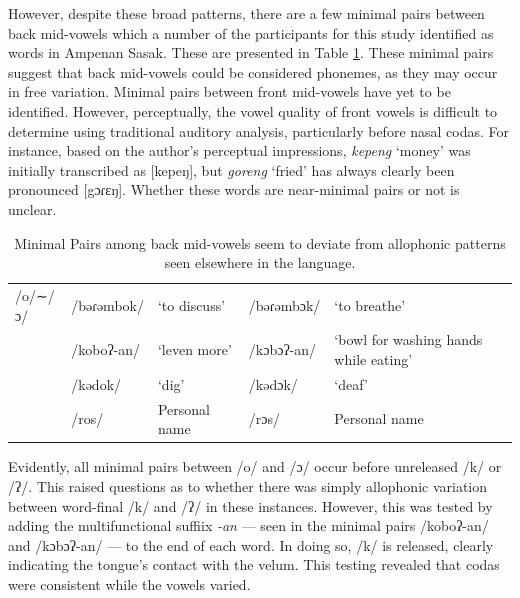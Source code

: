 \documentclass[12pt]{ouparticle}
\begin{document}
However, despite these broad patterns, there are a few  minimal pairs between back mid-vowels which a number of the participants for this study identified as words in Ampenan Sasak. These are presented in Table \ref{tab:minimal_pairs}. These minimal pairs suggest that back mid-vowels could be considered phonemes, as they may occur in free variation. Minimal pairs between front mid-vowels have yet to be identified. However, perceptually, the vowel quality of front vowels is difficult to determine using traditional auditory analysis, particularly before nasal codas. For instance, based on the author's perceptual impressions, \textit{kepeng} `money' was initially transcribed as [kepeŋ], but \textit{goreng} `fried' has always clearly been pronounced [gɔɾɛŋ]. Whether these words are near-minimal pairs or not is unclear.

\begin{table}[ht]
\caption{Minimal Pairs among back mid-vowels seem to deviate from allophonic patterns seen elsewhere in the language.}
\label{tab:minimal_pairs}
\begin{tabular}{l|ll|ll}
/o/∼/ɔ/	& /bəɾəmbok/ & `to discuss' & /bəɾəmbɔk/ & `to           breathe'\\
        & 	/koboʔ-an/ &	`leven more'	&  /kɔbɔʔ-an/& `bowl for washing hands while eating’\\
        & /kədok/ & `dig' & /kədɔk/ & `deaf'\\
        & /ros/	& Personal name  & /rɔs/ & Personal name\\
\end{tabular}
\end{table}

Evidently, all minimal pairs between /o/ and /ɔ/ occur before unreleased /k/ or /ʔ/. This raised questions as to whether there was simply allophonic variation between word-final /k/ and /ʔ/ in these instances. However, this was tested by adding the multifunctional suffiix \textit{-an} --- seen in the minimal pairs /koboʔ-an/ and /kɔbɔʔ-an/ --- to the end of each word. In doing so, /k/ is released, clearly indicating the tongue's contact with the velum. This testing revealed that codas were consistent while the vowels varied. 
\end{document}

